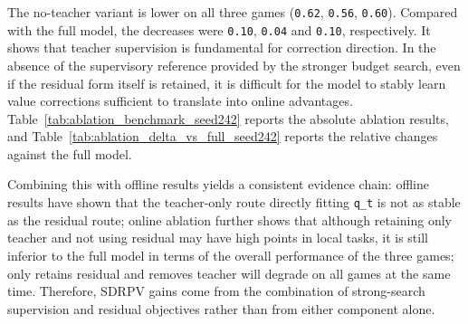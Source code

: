 The no-teacher variant is lower on all three games (\texttt{0.62}, \texttt{0.56}, \texttt{0.60}). Compared with the full model, the decreases were \texttt{0.10}, \texttt{0.04} and \texttt{0.10}, respectively. It shows that teacher supervision is fundamental for correction direction. In the absence of the supervisory reference provided by the stronger budget search, even if the residual form itself is retained, it is difficult for the model to stably learn value corrections sufficient to translate into online advantages.
Table~\ref{tab:ablation_benchmark_seed242} reports the absolute ablation results, and Table~\ref{tab:ablation_delta_vs_full_seed242} reports the relative changes against the full model.

Combining this with offline results yields a consistent evidence chain: 
offline results have shown that the teacher-only route directly fitting \texttt{q_t} is not as stable as the residual route; online ablation further shows that although retaining only teacher and not using residual may have high points in local tasks, it is still inferior to the full model in terms of the overall performance of the three games; only retains residual and removes teacher will degrade on all games at the same time. Therefore, SDRPV gains come from the combination of strong-search supervision and residual objectives rather than from either component alone.

